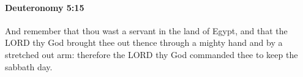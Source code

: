 
		\paragraph{Deuteronomy 5:15} %
			\label{DEUTERONOMY-5-15}

			And remember that thou wast a servant in the land of Egypt, and that the LORD thy God brought thee out thence through a mighty hand and by a stretched out arm: therefore the LORD thy God commanded thee to keep the sabbath day.


